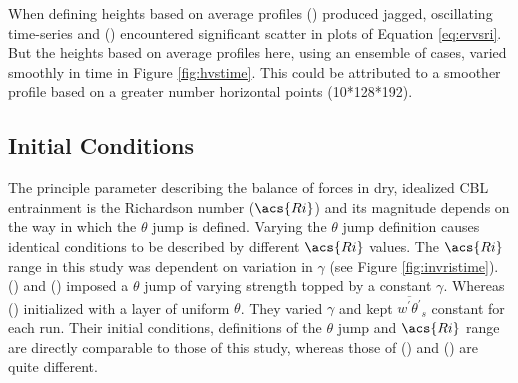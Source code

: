When defining heights based on average profiles \citeauthor{SullMoengStev} (\citeyear{SullMoengStev}) produced jagged, oscillating time-series and \citeauthor{BrooksFowler2} (\citeyear{BrooksFowler2}) encountered significant scatter in plots of Equation \ref{eq:ervsri}.  But the heights based on average profiles here, using an ensemble of cases, varied smoothly in time in Figure \ref{fig:hvstime}.  This could be attributed to a smoother profile based on a greater number horizontal points (10*128*192).\\

\subsection{Initial Conditions}

The principle parameter describing the balance of forces in dry, idealized \acs{CBL} entrainment is the Richardson number ($\acs{Ri}$) and its magnitude depends on the way in which the $\theta$ jump is defined.  Varying the $\theta$ jump definition causes identical conditions to be described by different $\acs{Ri}$ values.  The $\acs{Ri}$ range in this study was dependent on variation in $\gamma$ (see Figure \ref{fig:invristime}).  \citeauthor{BrooksFowler2} (\citeyear{BrooksFowler2}) and \citeauthor{SullMoengStev} (\citeyear{SullMoengStev}) imposed a $\theta$ jump of varying strength topped by a constant $\gamma$.  Whereas \citeauthor{FedConzMir04} (\citeyear{FedConzMir04}) initialized with a layer of uniform $\theta$.  They varied $\gamma$ and kept $\overline{w^{'}\theta^{'}}_{s}$ constant for each run.  Their initial conditions, definitions of the $\theta$ jump and $\acs{Ri}$ range are directly comparable to those of this study, whereas those of \citeauthor{BrooksFowler2} (\citeyear{BrooksFowler2}) and \citeauthor{SullMoengStev} (\citeyear{SullMoengStev}) are quite different.\\    

